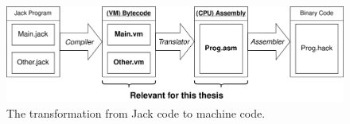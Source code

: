 \begin{center}
  \begin{figure}[ht]
    \centering
    \includegraphics[width=14cm]{fig/hack-pipeline.png}
    \caption{The transformation from Jack code to machine code.}
    \label{fig:hack-pipeline}
  \end{figure}
\end{center}

%
